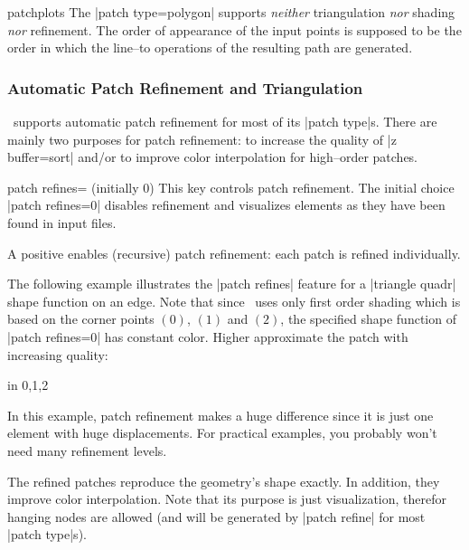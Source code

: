 {\begin{pgfplotslibrary}{patchplots}
	The |patch type=polygon| supports \emph{neither} triangulation \emph{nor} shading \emph{nor} refinement. The order of appearance of the input points is supposed to be the order in which the line--to operations of the resulting path are generated.




\subsubsection{Automatic Patch Refinement and Triangulation}
\label{sec:lib:patchplots:refinement}
\PGFPlots\ supports automatic patch refinement for most of its |patch type|s. There are mainly two purposes for patch refinement: to increase the quality of |z buffer=sort| and/or to improve color interpolation for high--order patches. 

\begin{pgfplotskey}{patch refines= (initially 0)}
	This key controls patch refinement. The initial choice |patch refines=0| disables refinement and visualizes elements as they have been found in input files.

	A positive  enables (recursive) patch refinement: each patch is refined individually. 

	The following example illustrates the |patch refines| feature for a |triangle quadr| shape function on an edge. Note that since \PGFPlots\ uses only first order shading which is based on the corner points $(0)$, $(1)$ and $(2)$, the specified shape function of |patch refines=0| has constant color. Higher  approximate the patch with increasing quality:
\begin{codeexample}[]
\foreach \level in {0,1,2} {%
}
\end{codeexample}
	\noindent In this example, patch refinement makes a huge difference since it is just one element with huge displacements. For practical examples, you probably won't need many refinement levels.
	
	The refined patches reproduce the geometry's shape exactly. In addition, they improve color interpolation. Note that its purpose is just visualization, therefor hanging nodes are allowed (and will be generated by |patch refine| for most |patch type|s).


\end{pgfplotskey}
\end{pgfplotslibrary}}
